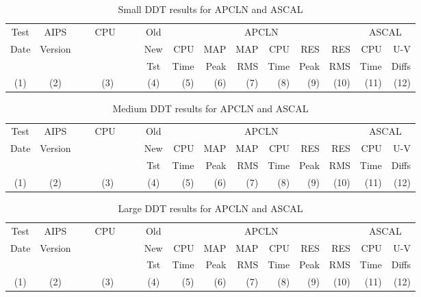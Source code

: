 \begin{table}[h]
\begin{center}
\begin{tabular}{cccc|rrrrrr|rr}
\hline \hline
Test      &  AIPS    &~~~CPU~~~~& Old  &  \multicolumn{6}{c|}{APCLN}&   \multicolumn{2}{c}{ASCAL}  \\
  Date    & Version  &          & New  &   CPU    &    MAP    &    MAP    &    CPU    &    RES&RES &CPU     &    U-V   \\
          &          &          & Tst  &  Time    &   Peak    &    RMS    &   Time    &   Peak&RMS &Time    &   Diffs  \\
  (1)     &   (2)    &  (3)     & (4)  & (5)      &   (6)     &   (7)     &   (8)     &    (9)&(10)&  (11)  & (12) \\
\hline

\hline \hline
\end{tabular}
\end{center}
\caption{Small DDT results for APCLN and ASCAL}
\end{table}

\clearpage

\begin{table}[h]
\begin{center}
\begin{tabular}{cccc|rrrrrr|rr}
\hline \hline
Test      &  AIPS    &~~~CPU~~~~& Old  &  \multicolumn{6}{c|}{APCLN}&   \multicolumn{2}{c}{ASCAL}  \\
  Date    & Version  &          & New  &   CPU    &    MAP    &    MAP    &    CPU    &    RES&RES &CPU     &    U-V   \\
          &          &          & Tst  &  Time    &   Peak    &    RMS    &   Time    &   Peak&RMS &Time    &   Diffs  \\
  (1)     &   (2)    &  (3)     & (4)  & (5)      &   (6)     &   (7)     &   (8)     &    (9)&(10)&  (11)  & (12) \\
\hline

\hline \hline
\end{tabular}
\end{center}
\caption{Medium DDT results for APCLN and ASCAL}
\end{table}

\begin{table}[h]
\begin{center}
\begin{tabular}{cccc|rrrrrr|rr}
\hline \hline
Test      &  AIPS    &~~~CPU~~~~& Old  &  \multicolumn{6}{c|}{APCLN}&   \multicolumn{2}{c}{ASCAL}  \\
  Date    & Version  &          & New  &   CPU    &    MAP    &    MAP    &    CPU    &    RES&RES &CPU     &    U-V   \\
          &          &          & Tst  &  Time    &   Peak    &    RMS    &   Time    &   Peak&RMS &Time    &   Diffs  \\
  (1)     &   (2)    &  (3)     & (4)  & (5)      &   (6)     &   (7)     &   (8)     &    (9)&(10)&  (11)  & (12) \\
\hline

\hline \hline
\end{tabular}
\end{center}
\caption{Large DDT results for APCLN and ASCAL}
\end{table}

